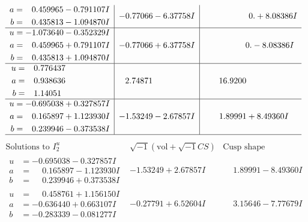 \documentclass[1p]{elsarticle_modified}
\theoremstyle{definition}
\newcommand{\I}{\sqrt{-1}}
\begin{document}
$$\begin{array}{c|c|c}
\begin{aligned}
a &= \phantom{-}0.459965 - 0.791107 I \\
b &= \phantom{-}0.435813 - 1.094870 I\end{aligned}
 & -0.77066 - 6.37758 I & \phantom{-0.000000 -}0. + 8.08386 I \\ \hline\begin{aligned}
u &= -1.073640 - 0.352329 I \\
a &= \phantom{-}0.459965 + 0.791107 I \\
b &= \phantom{-}0.435813 + 1.094870 I\end{aligned}
 & -0.77066 + 6.37758 I & \phantom{-0.000000 } 0. - 8.08386 I \\ \hline\begin{aligned}
u &= \phantom{-}0.776437\phantom{ +0.000000I} \\
a &= \phantom{-}0.938636\phantom{ +0.000000I} \\
b &= \phantom{-}1.14051\phantom{ +0.000000I}\end{aligned}
 & \phantom{-}2.74871\phantom{ +0.000000I} & \phantom{-}16.9200\phantom{ +0.000000I} \\ \hline\begin{aligned}
u &= -0.695038 + 0.327857 I \\
a &= \phantom{-}0.165897 + 1.123930 I \\
b &= \phantom{-}0.239946 - 0.373538 I\end{aligned}
 & -1.53249 - 2.67857 I & \phantom{-}1.89991 + 8.49360 I\\
 \hline 
 \end{array}$$\newpage$$\begin{array}{c|c|c}  
\text{Solutions to }I^u_{2}& \I (\text{vol} + \sqrt{-1}CS) & \text{Cusp shape}\\
 \hline 
\begin{aligned}
u &= -0.695038 - 0.327857 I \\
a &= \phantom{-}0.165897 - 1.123930 I \\
b &= \phantom{-}0.239946 + 0.373538 I\end{aligned}
 & -1.53249 + 2.67857 I & \phantom{-}1.89991 - 8.49360 I \\ \hline\begin{aligned}
u &= \phantom{-}0.458761 + 1.156150 I \\
a &= -0.636440 + 0.663107 I \\
b &= -0.283339 - 0.081277 I\end{aligned}
 & -0.27791 + 6.52604 I & \phantom{-}3.15646 - 7.77679 I \\ \hline\begin{aligned}

\end{aligned}
\end{array}$$
\end{document}
